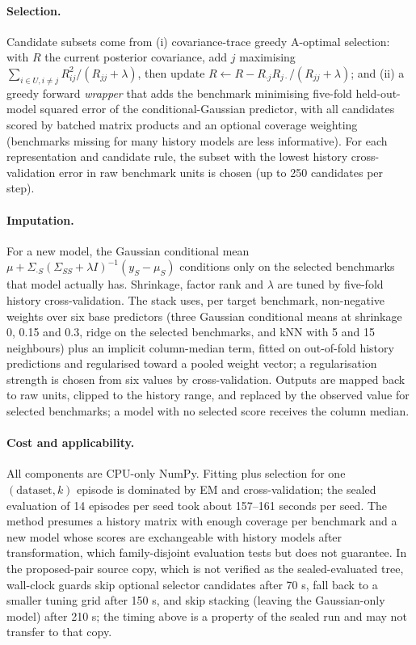 \documentclass{article}
\begin{document}
\paragraph{Selection.} Candidate subsets come from (i) covariance-trace greedy A-optimal selection: with $R$ the current posterior covariance, add $j$ maximising $\sum_{i\in U,i\ne j}R_{ij}^2/(R_{jj}+\lambda)$, then update $R\leftarrow R-R_{\cdot j}R_{j\cdot}/(R_{jj}+\lambda)$; and (ii) a greedy forward \emph{wrapper} that adds the benchmark minimising five-fold held-out-model squared error of the conditional-Gaussian predictor, with all candidates scored by batched matrix products and an optional coverage weighting (benchmarks missing for many history models are less informative). For each representation and candidate rule, the subset with the lowest history cross-validation error in raw benchmark units is chosen (up to 250 candidates per step).

\paragraph{Imputation.} For a new model, the Gaussian conditional mean $\mu+\Sigma_{\cdot S}(\Sigma_{SS}+\lambda I)^{-1}(y_S-\mu_S)$ conditions only on the selected benchmarks that model actually has. Shrinkage, factor rank and $\lambda$ are tuned by five-fold history cross-validation. The stack uses, per target benchmark, non-negative weights over six base predictors (three Gaussian conditional means at shrinkage 0, 0.15 and 0.3, ridge on the selected benchmarks, and kNN with 5 and 15 neighbours) plus an implicit column-median term, fitted on out-of-fold history predictions and regularised toward a pooled weight vector; a regularisation strength is chosen from six values by cross-validation. Outputs are mapped back to raw units, clipped to the history range, and replaced by the observed value for selected benchmarks; a model with no selected score receives the column median.

\paragraph{Cost and applicability.} All components are CPU-only NumPy. Fitting plus selection for one $(\text{dataset},k)$ episode is dominated by EM and cross-validation; the sealed evaluation of 14 episodes per seed took about 157--161 seconds per seed. The method presumes a history matrix with enough coverage per benchmark and a new model whose scores are exchangeable with history models after transformation, which family-disjoint evaluation tests but does not guarantee. In the proposed-pair source copy, which is not verified as the sealed-evaluated tree, wall-clock guards skip optional selector candidates after 70 s, fall back to a smaller tuning grid after 150 s, and skip stacking (leaving the Gaussian-only model) after 210 s; the timing above is a property of the sealed run and may not transfer to that copy.
\end{document}
